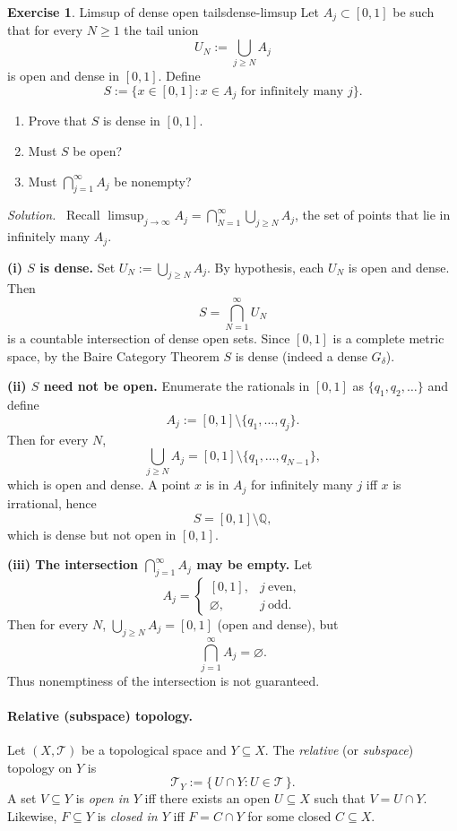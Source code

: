 \documentclass[11pt,a4paper]{article}
\theoremstyle{definition}
\newtheorem{exercise}{Exercise} %
\theoremstyle{definition}
\theoremstyle{plain}
\theoremstyle{remark}
\newenvironment{solution}{\par\noindent\textit{Solution.}\ }{\par\vspace{0.5em}}
\begin{document}
	
\begin{exercise}{Limsup of dense open tails}{dense-limsup}
	Let $A_j\subset[0,1]$ be such that for every $N\ge1$ the tail union
	\[
	U_N:=\bigcup_{j\ge N} A_j
	\]
	is open and dense in $[0,1]$. Define
	\[
	S:=\{x\in[0,1]: x\in A_j \text{ for infinitely many } j\}.
	\]
	\begin{enumerate}
		\item[(i)] Prove that $S$ is dense in $[0,1]$.
		\item[(ii)] Must $S$ be open?
		\item[(iii)] Must $\bigcap_{j=1}^\infty A_j$ be nonempty?
	\end{enumerate}
\end{exercise}

\begin{solution}
	Recall $\displaystyle \limsup_{j\to\infty} A_j=\bigcap_{N=1}^\infty \bigcup_{j\ge N} A_j$,
	the set of points that lie in infinitely many $A_j$.
	
	\medskip
	\textbf{(i) $S$ is dense.}
	Set $U_N:=\bigcup_{j\ge N} A_j$. By hypothesis, each $U_N$ is open and dense.
	Then
	\[
	S=\bigcap_{N=1}^{\infty} U_N
	\]
	is a countable intersection of dense open sets. Since $[0,1]$ is a complete metric space,
	by the Baire Category Theorem $S$ is dense (indeed a dense $G_\delta$).
	
	\medskip
	\textbf{(ii) $S$ need not be open.}
	Enumerate the rationals in $[0,1]$ as $\{q_1,q_2,\dots\}$ and define
	\[
	A_j:=[0,1]\setminus\{q_1,\dots,q_j\}.
	\]
	Then for every $N$,
	\[
	\bigcup_{j\ge N} A_j=[0,1]\setminus\{q_1,\dots,q_{N-1}\},
	\]
	which is open and dense. A point $x$ is in $A_j$ for infinitely many $j$ iff $x$ is irrational,
	hence
	\[
	S=[0,1]\setminus\mathbb{Q},
	\]
	which is dense but not open in $[0,1]$.
	
	\medskip
	\textbf{(iii) The intersection $\bigcap_{j=1}^\infty A_j$ may be empty.}
	Let
	\[
	A_j=
	\begin{cases}
		[0,1], & j\ \text{even},\\
		\varnothing, & j\ \text{odd}.
	\end{cases}
	\]
	Then for every $N$, $\bigcup_{j\ge N} A_j=[0,1]$ (open and dense), but
	\[
	\bigcap_{j=1}^\infty A_j=\varnothing.
	\]
	Thus nonemptiness of the intersection is not guaranteed.
\end{solution}


\paragraph{Relative (subspace) topology.}
Let $(X,\mathcal T)$ be a topological space and $Y\subseteq X$.
The \emph{relative} (or \emph{subspace}) topology on $Y$ is
\[
\mathcal T_Y := \{\, U\cap Y : U\in\mathcal T \,\}.
\]
A set $V\subseteq Y$ is \emph{open in $Y$} iff there exists an open $U\subseteq X$
such that $V=U\cap Y$. Likewise, $F\subseteq Y$ is \emph{closed in $Y$} iff
$F=C\cap Y$ for some closed $C\subseteq X$.
\end{document}
